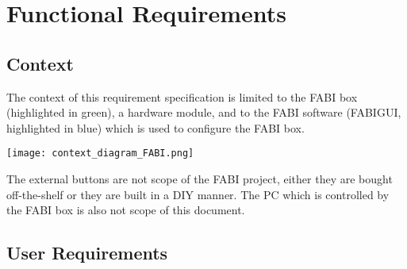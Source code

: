\documentclass[]{scrreprt}%
\newcommand{\note}[1]{\textcolor{black!50}{\textit{Note: #1}}}
\begin{document}



% 
% 
% 


\chapter{Functional Requirements}

\section{Context}

The context of this requirement specification is limited to the FABI box (highlighted in green), a hardware module, and to the 
FABI software (FABIGUI, highlighted in blue) which is used to configure the FABI box.

\begin{center}
    \texttt{[image: context\_diagram\_FABI.png]}
\end{center}


The external buttons are not scope of the FABI project, either they are bought off-the-shelf or they are built in a DIY manner. The PC which
is controlled by the FABI box is also not scope of this document.


\section{User Requirements}
\end{document}
